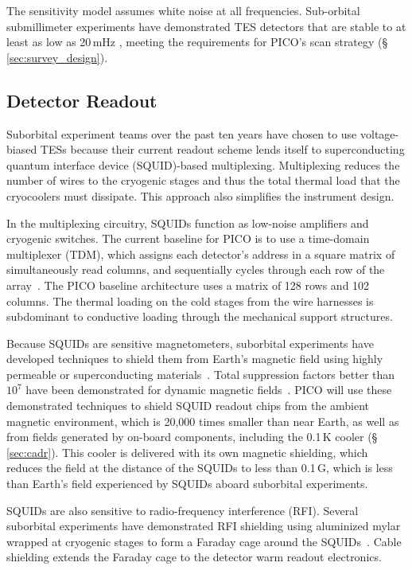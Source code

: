 The sensitivity model assumes white noise at all frequencies. Sub-orbital submillimeter experiments have demonstrated TES detectors that are stable to at least as low as 20\,mHz \citep{Rahlin2014}, meeting the requirements for PICO's scan strategy (\S\,\ref{sec:survey_design}). 

\subsection{Detector Readout}
\label{sec:detector_readout} %

Suborbital experiment teams over the past ten years have chosen to use voltage-biased TESs because their current readout scheme lends itself to superconducting quantum interface device (SQUID)-based multiplexing. Multiplexing reduces the number of wires to the cryogenic stages and thus the total thermal load that the cryocoolers must dissipate. This approach also simplifies the instrument design.

In the multiplexing circuitry, SQUIDs function as low-noise amplifiers and cryogenic switches. The current baseline for PICO is to use a time-domain multiplexer (TDM), which assigns each detector's address in a square matrix of simultaneously read columns, and sequentially cycles through each row of the array~\citep{Henderson2016}. The PICO baseline architecture uses a matrix of 128 rows and 102 columns. The thermal loading on the cold stages from the wire harnesses is subdominant to conductive loading through the mechanical support structures.

Because SQUIDs are sensitive magnetometers, suborbital experiments have developed techniques to shield them from Earth's magnetic field using highly permeable or superconducting materials~\citep{Hui2018}.  Total suppression factors better than $10^7$ have been demonstrated for dynamic magnetic fields~\citep{Runyan2010}. PICO will use these demonstrated techniques to shield SQUID readout chips from the ambient magnetic environment, which is 20,000 times smaller than near Earth, as well as from fields generated by on-board components, including the 0.1\,K cooler (\S\,\ref{sec:cadr}). This cooler is delivered with its own magnetic shielding, which reduces the field at the distance of the SQUIDs to less than 0.1\,G, which is less than Earth's field experienced by SQUIDs aboard suborbital experiments.

SQUIDs are also sensitive to radio-frequency interference (RFI). Several suborbital experiments have demonstrated RFI shielding using aluminized mylar wrapped at cryogenic stages to form a Faraday cage around the SQUIDs~\citep{Kermish2012,EBEX2018,BICEP2014}. Cable shielding extends the Faraday cage to the detector warm readout electronics.

